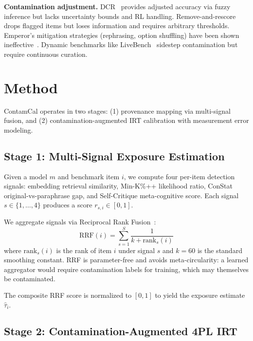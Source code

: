 \documentclass[letterpaper]{article}
\begin{document}
\textbf{Contamination adjustment.}
DCR~\citep{yang2025dcr} provides adjusted accuracy via fuzzy inference but lacks uncertainty bounds and RL handling.
Remove-and-rescore drops flagged items but loses information and requires arbitrary thresholds.
Emperor's mitigation strategies (rephrasing, option shuffling) have been shown ineffective~\citep{xu2025emperor}.
Dynamic benchmarks like LiveBench~\citep{white2024livebench} sidestep contamination but require continuous curation.

\section{Method}
\label{sec:method}

ContamCal operates in two stages: (1) provenance mapping via multi-signal fusion, and (2) contamination-augmented IRT calibration with measurement error modeling.

\subsection{Stage 1: Multi-Signal Exposure Estimation}
\label{sec:stage1}

Given a model $m$ and benchmark item $i$, we compute four per-item detection signals: embedding retrieval similarity, Min-K\%++ likelihood ratio, ConStat original-vs-paraphrase gap, and Self-Critique meta-cognitive score.
Each signal $s \in \{1,\ldots,4\}$ produces a score $r_{s,i} \in [0,1]$.

We aggregate signals via Reciprocal Rank Fusion~\citep{cormack2009reciprocal}:
\begin{equation}
  \text{RRF}(i) = \sum_{s=1}^{S} \frac{1}{k + \text{rank}_s(i)}
  \label{eq:rrf}
\end{equation}
where $\text{rank}_s(i)$ is the rank of item $i$ under signal $s$ and $k=60$ is the standard smoothing constant.
RRF is parameter-free and avoids meta-circularity: a learned aggregator would require contamination labels for training, which may themselves be contaminated.

The composite RRF score is normalized to $[0,1]$ to yield the exposure estimate $\hat{\tau}_i$.

\subsection{Stage 2: Contamination-Augmented 4PL IRT}
\label{sec:stage2}
\end{document}
